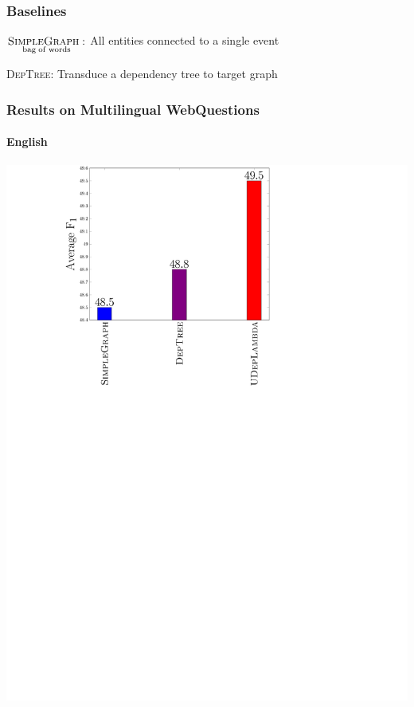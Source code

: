 \documentclass[mathserif,12pt]{beamer}
\newcommand{\hlight}[1]{{\color{blue!80} #1}}
\newcommand \deptree{\textsc{DepTree}\xspace}
\newcommand \simplegraph{\textsc{SimpleGraph}\xspace}
\newcommand \ccggraph{\textsc{CCGGraph}\xspace}
\begin{document}
\begin{frame}
\large
\frametitle{Baselines}
\hlight{$\underset{\mathrm{bag\; of\; words}}{\simplegraph:}$ }All entities connected to a single event



\vspace{2em}
\hlight{\deptree:} Transduce a dependency tree to target graph \\

\end{frame}

\begin{frame}
\frametitle{Results on Multilingual WebQuestions}
\framesubtitle{English}
\centering
\large
\vspace{0.4em}
\includegraphics[trim=9.5em 0em 23em 1em,clip=true,scale=0.5]{figures/deplambda_results_plot_ud}
\end{frame}
\end{document}
